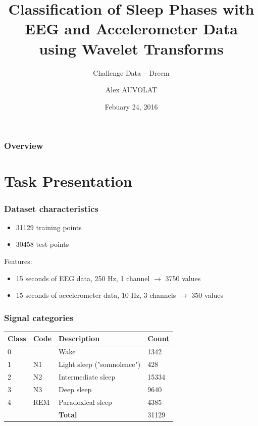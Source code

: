 \documentclass{beamer}
\title{Classification of Sleep Phases with EEG and Accelerometer Data using Wavelet Transforms}
\subtitle{Challenge Data -- Dreem}
\author{Alex AUVOLAT}
\date{Febuary 24, 2016}
\begin{document}
\begin{frame}
\titlepage
\end{frame}

\begin{frame}
\frametitle{Overview}
\tableofcontents
\end{frame}

\section{Task Presentation}
\frame{\sectionpage}

\begin{frame}
	\frametitle{Dataset characteristics}
	\begin{itemize}
		\item 31129 training points
		\item 30458 test points
	\end{itemize}
	Features:
	\begin{itemize}
		\item 15 seconds of EEG data, 250 Hz, 1 channel $\to$ 3750 values
		\item 15 seconds of accelerometer data, 10 Hz, 3 channels $\to$ 350 values
	\end{itemize}
\end{frame}

\begin{frame}
	\frametitle{Signal categories}
	\begin{table}\centering
	\begin{tabular}{l l l l}
		\textbf{Class}&\textbf{Code}&\textbf{Description}&\textbf{Count}\\ \hline
		0 & & Wake & 1342\\
		1 & N1 & Light sleep ("somnolence") & 428 \\
		2 & N2 & Intermediate sleep & 15334 \\
		3 & N3 & Deep sleep & 9640 \\
		4 & REM & Paradoxical sleep & 4385 \\ \hline
		& & \textbf{Total} & 31129 \\
	\end{tabular}
	\end{table}
\end{frame}
\end{document}
